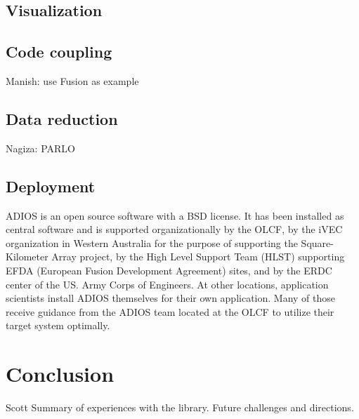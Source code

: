 \subsection{Visualization}



\subsection{Code coupling}
{\color {red}Manish: use Fusion as example}



\subsection{Data reduction}
{\color {red}Nagiza: PARLO}




\subsection{Deployment}
ADIOS is an open source software with a BSD license. It has been installed as central software and is supported organizationally by the OLCF, by the iVEC organization in Western Australia for the purpose of supporting the Square-Kilometer Array project, by the High Level Support Team (HLST) supporting EFDA (European Fusion Development Agreement) sites, and by the ERDC center of the US. Army Corps of Engineers. At other locations, application scientists install ADIOS themselves for their own application. Many of those receive guidance from the ADIOS team located at the OLCF to utilize their target system optimally.





\section{Conclusion}
{\color {red}Scott}
{\color {red}Summary of experiences with the library. Future challenges and directions.}


